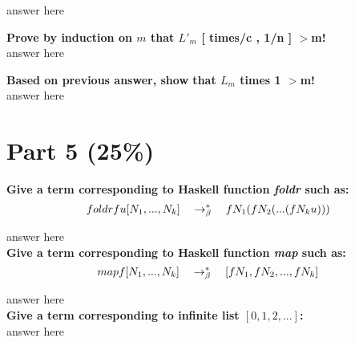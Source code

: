 \documentclass{article}
\begin{document}
	answer here
	\newline
	
	\textbf{Prove by induction on $m$ that $L'_m$ [ times/c , 1/n ] $>$\be \quad m!}\\
	
	answer here
	\newline
	
	\textbf{Based on previous answer, show that $L_m$ times 1  $>$\be \quad m!}\\
	
	answer here
	
	
	\section{Part 5 (25\%)}
	
	\textbf{Give a \lamb term corresponding to Haskell function \textit{foldr} such as:}\\
	
	\begin{equation*}
		foldr  f  u [N_1,...,N_k] \quad \rightarrow_\beta^*\quad f N_1(f N_2(...(f N_k u)))
	\end{equation*}
	
	answer here\\
	
	\textbf{Give a \lamb term corresponding to Haskell function \textit{map} such as:}\\
	
	\begin{equation*}
		map  f [N_1,...,N_k] \quad \rightarrow_\beta^*\quad [f N_1,f N_2,...,f N_k]
	\end{equation*}
	
	answer here\\
	
	\textbf{Give a \lamb term corresponding to infinite list $[0,1,2,...]$:}\\
	
	answer here
\end{document}
